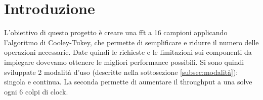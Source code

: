 \section{Introduzione}
L’obiettivo di questo progetto è creare una fft a 16 campioni applicando l’algoritmo di Cooley-Tukey, che permette di semplificare e ridurre il numero delle operazioni necessarie. Date quindi le richieste e le limitazioni sui componenti da impiegare dovevamo ottenere le migliori performance possibili.
Si sono quindi sviluppate 2 modalità d’uso (descritte nella sottosezione \ref{subsec:modalità}): singola e continua. La seconda permette di aumentare il throughput a una solve ogni 6 colpi di clock.
